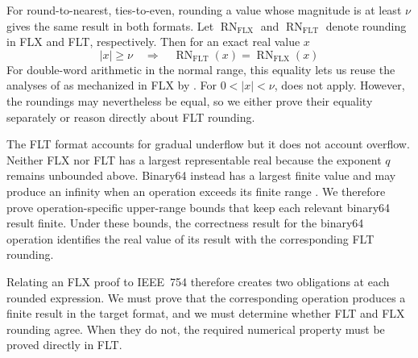 For round-to-nearest, ties-to-even, rounding a value whose magnitude is at
least $\nu$ gives the same result in both formats.  Let
$\operatorname{RN}_{\mathrm{FLX}}$ and
$\operatorname{RN}_{\mathrm{FLT}}$ denote rounding in FLX and FLT,
respectively.  Then for an exact real value $x$
\begin{equation}
  |x|\geq\nu
  \quad\Longrightarrow\quad
  \operatorname{RN}_{\mathrm{FLT}}(x)
    =\operatorname{RN}_{\mathrm{FLX}}(x)
  \label{eq:round-flt-flx}
\end{equation}
For double-word arithmetic in the normal range, this equality lets us reuse
the analyses of \citet{Joldes2017} as mechanized in FLX by
\citet{Rideau2022}.  For
$0<|x|<\nu$, \cite{eq:round-flt-flx} does not apply.  However, the
 roundings may nevertheless be equal, so
we either prove their equality separately or reason directly about FLT
rounding.

The FLT format accounts for gradual underflow but it does not account
overflow.  Neither FLX nor FLT has a largest representable real because the
exponent $q$ remains unbounded above.  Binary64 instead has a largest finite
value and may produce an infinity when an operation exceeds its finite range
\citep{IEEE754-2019}.  We therefore prove operation-specific upper-range
bounds that keep each relevant binary64 result finite.  Under these bounds,
the correctness result for the binary64 operation identifies the real value
of its result with the corresponding FLT rounding.

Relating an FLX proof to IEEE~754 therefore creates two obligations at each
rounded expression.  We must prove that the corresponding operation produces
a finite result in the target format, and we must determine whether FLT and
FLX rounding agree.  When they do not, the required numerical property must
be proved directly in FLT.
